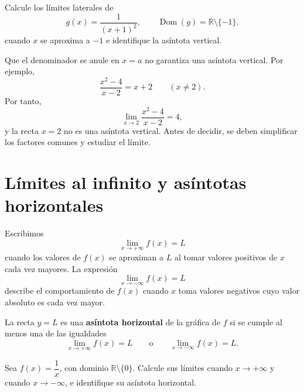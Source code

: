 \documentclass[10pt,a5paper]{article}
\newif\ifmostrarSoluciones
\begin{document}
\begin{ejemplo}
Calcule los límites laterales de
\[
  g(x)=\frac{1}{(x+1)^2},\qquad
  \operatorname{Dom}(g)=\mathbb{R}\setminus\{-1\}.
\]
cuando $x$ se aproxima a $-1$ e identifique la asíntota vertical.
\end{ejemplo}
\ifmostrarSoluciones
\begin{solucion}
Para $x\neq-1$, el denominador $(x+1)^2$ es positivo. Al aproximarse $x$ a $-1$ por cualquiera de los dos lados, el denominador se aproxima a $0$ mediante valores positivos. En consecuencia,
\[
  \lim_{x\to-1^-}\frac{1}{(x+1)^2}
  =\lim_{x\to-1^+}\frac{1}{(x+1)^2}
  =+\infty.
\]
En este caso también podemos escribir
\[
  \lim_{x\to-1}\frac{1}{(x+1)^2}=+\infty.
\]
La recta $x=-1$ es una asíntota vertical.
\end{solucion}
\else\vspace{18mm}\fi

\begin{nota}
Que el denominador se anule en $x=a$ no garantiza una asíntota vertical. Por ejemplo,
\[
  \frac{x^2-4}{x-2}=x+2
  \qquad (x\neq2).
\]
Por tanto,
\[
  \lim_{x\to2}\frac{x^2-4}{x-2}=4,
\]
y la recta $x=2$ no es una asíntota vertical. Antes de decidir, se deben simplificar los factores comunes y estudiar el límite.
\end{nota}

\section*{Límites al infinito y asíntotas horizontales}

\begin{definicion}
Escribimos
\[
  \lim_{x\to+\infty}f(x)=L
\]
cuando los valores de $f(x)$ se aproximan a $L$ al tomar valores positivos de $x$ cada vez mayores. La expresión
\[
  \lim_{x\to-\infty}f(x)=L
\]
describe el comportamiento de $f(x)$ cuando $x$ toma valores negativos cuyo valor absoluto es cada vez mayor.
\end{definicion}

\begin{definicion}
La recta $y=L$ es una \textbf{asíntota horizontal} de la gráfica de $f$ si se cumple al menos una de las igualdades
\[
  \lim_{x\to+\infty}f(x)=L
  \qquad\text{o}\qquad
  \lim_{x\to-\infty}f(x)=L.
\]
\end{definicion}


\begin{ejemplo}
Sea $f(x)=\dfrac{1}{x}$, con dominio $\mathbb{R}\setminus\{0\}$. Calcule sus límites cuando $x\to+\infty$ y cuando $x\to-\infty$, e identifique su asíntota horizontal.
\end{ejemplo}
\ifmostrarSoluciones
\begin{solucion}
Cuando $x$ crece en valor absoluto, $1/x$ se aproxima a $0$: toma valores positivos si $x>0$ y negativos si $x<0$. Por tanto,
\[
  \lim_{x\to+\infty}\frac{1}{x}=0,
  \qquad
  \lim_{x\to-\infty}\frac{1}{x}=0.
\]
La recta $y=0$ es una asíntota horizontal.
\end{solucion}
\else\vspace{18mm}\fi
\end{document}

